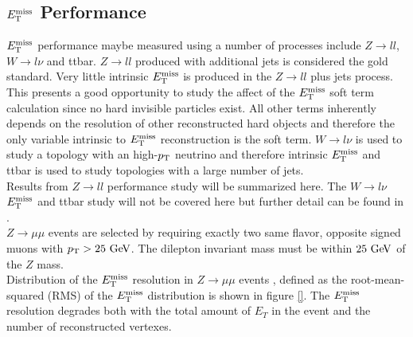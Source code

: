 \subsection{$E_{\mathrm{T}}^{\mathrm{miss}}$ Performance}
\label{sec:reco:METPerform}

\indent $E_{\mathrm{T}}^{\mathrm{miss}}$ performance maybe measured using a number of processes include $Z\rightarrow ll$, $W\rightarrow l\nu$ and ttbar.  $Z\rightarrow ll$ produced with additional jets is considered the gold standard.  Very little intrinsic $E_{\mathrm{T}}^{\mathrm{miss}}$ is produced in the $Z\rightarrow ll$ plus jets process.  This presents a good opportunity to study the affect of the $E_{\mathrm{T}}^{\mathrm{miss}}$ soft term calculation since no hard invisible particles exist.  All other terms inherently depends on the resolution of other reconstructed hard objects and therefore the only variable intrinsic to $E_{\mathrm{T}}^{\mathrm{miss}}$ reconstruction is the soft term.  $W\rightarrow l\nu$ is used to study a topology with an high-$p_{\mathrm{T}}$ neutrino and therefore intrinsic $E_{\mathrm{T}}^{\mathrm{miss}}$ and ttbar is used to study topologies with a large number of jets. \\

\indent Results from $Z\rightarrow ll$ performance study \cite{METReco} will be summarized here.  The $W\rightarrow l\nu$ $E_{\mathrm{T}}^{\mathrm{miss}}$ and ttbar study will not be covered here but further detail can be found in \cite{METReco}. \\

\indent $Z\rightarrow \mu\mu$ events are selected by requiring exactly two same flavor, opposite signed muons with $\pt > 25 \gev$. The dilepton invariant mass must be within $25 \gev$ of the $Z$ mass. \\

\indent Distribution of the $E_{\mathrm{T}}^{\mathrm{miss}}$ resolution in $Z\rightarrow \mu\mu$ events , defined as the root-mean-squared (RMS) of the $E_{\mathrm{T}}^{\mathrm{miss}}$ distribution is shown in figure \ref{}.  The $E_{\mathrm{T}}^{\mathrm{miss}}$ resolution degrades both with the total amount of $E_T$ in the event and the number of reconstructed vertexes.\\

